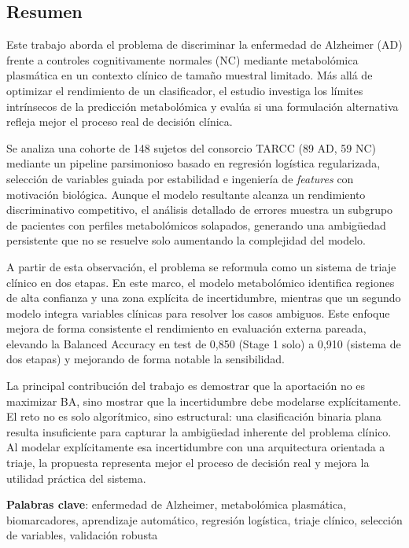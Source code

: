 \noindent \begin{center}
\section*{Resumen}
\par\end{center}

Este trabajo aborda el problema de discriminar la enfermedad de Alzheimer (AD) frente a controles cognitivamente normales (NC) mediante metabolómica plasmática en un contexto clínico de tamaño muestral limitado. Más allá de optimizar el rendimiento de un clasificador, el estudio investiga los límites intrínsecos de la predicción metabolómica y evalúa si una formulación alternativa refleja mejor el proceso real de decisión clínica.

Se analiza una cohorte de 148 sujetos del consorcio TARCC (89 AD, 59 NC) mediante un pipeline parsimonioso basado en regresión logística regularizada, selección de variables guiada por estabilidad e ingeniería de \textit{features} con motivación biológica. Aunque el modelo resultante alcanza un rendimiento discriminativo competitivo, el análisis detallado de errores muestra un subgrupo de pacientes con perfiles metabolómicos solapados, generando una ambigüedad persistente que no se resuelve solo aumentando la complejidad del modelo.

A partir de esta observación, el problema se reformula como un sistema de triaje clínico en dos etapas. En este marco, el modelo metabolómico identifica regiones de alta confianza y una zona explícita de incertidumbre, mientras que un segundo modelo integra variables clínicas para resolver los casos ambiguos. Este enfoque mejora de forma consistente el rendimiento en evaluación externa pareada, elevando la Balanced Accuracy en test de 0,850 (Stage 1 solo) a 0,910 (sistema de dos etapas) y mejorando de forma notable la sensibilidad.

La principal contribución del trabajo es demostrar que la aportación no es maximizar BA, sino mostrar que la incertidumbre debe modelarse explícitamente. El reto no es solo algorítmico, sino estructural: una clasificación binaria plana resulta insuficiente para capturar la ambigüedad inherente del problema clínico. Al modelar explícitamente esa incertidumbre con una arquitectura orientada a triaje, la propuesta representa mejor el proceso de decisión real y mejora la utilidad práctica del sistema.

\vspace{0.5cm}
\begin{flushleft}
\textbf{Palabras clave}: enfermedad de Alzheimer, metabolómica plasmática, biomarcadores, aprendizaje automático, regresión logística, triaje clínico, selección de variables, validación robusta
\end{flushleft}